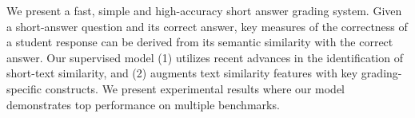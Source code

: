 We present a fast, simple and high-accuracy short answer grading system. Given a short-answer question and its correct answer, key measures of the correctness of a student response can be derived from its semantic similarity with the correct answer. Our supervised model (1) utilizes recent advances in the identification of short-text similarity, and (2) augments text similarity features with key grading-specific constructs. We present experimental results where our model demonstrates top performance on multiple benchmarks.

